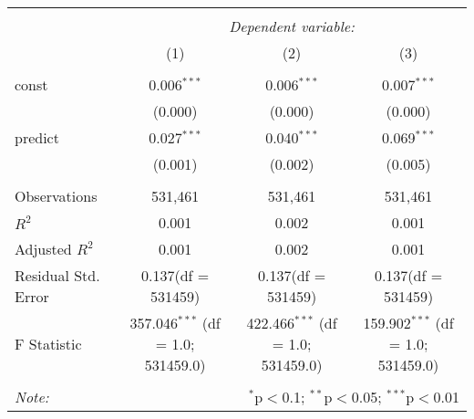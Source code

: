 \begin{table}[!htbp] \centering
\begin{tabular}{@{\extracolsep{5pt}}lccc}
\\[-1.8ex]\hline
\hline \\[-1.8ex]
& \multicolumn{3}{c}{\textit{Dependent variable:}} \
\cr \cline{3-4}
\\[-1.8ex] & (1) & (2) & (3) \\
\hline \\[-1.8ex]
 const & 0.006$^{***}$ & 0.006$^{***}$ & 0.007$^{***}$ \\
  & (0.000) & (0.000) & (0.000) \\
 predict & 0.027$^{***}$ & 0.040$^{***}$ & 0.069$^{***}$ \\
  & (0.001) & (0.002) & (0.005) \\
\hline \\[-1.8ex]
 Observations & 531,461 & 531,461 & 531,461 \\
 $R^2$ & 0.001 & 0.002 & 0.001 \\
 Adjusted $R^2$ & 0.001 & 0.002 & 0.001 \\
 Residual Std. Error & 0.137(df = 531459) & 0.137(df = 531459) & 0.137(df = 531459)  \\
 F Statistic & 357.046$^{***}$ (df = 1.0; 531459.0) & 422.466$^{***}$ (df = 1.0; 531459.0) & 159.902$^{***}$ (df = 1.0; 531459.0) \\
\hline
\hline \\[-1.8ex]
\textit{Note:} & \multicolumn{3}{r}{$^{*}$p$<$0.1; $^{**}$p$<$0.05; $^{***}$p$<$0.01} \\
\end{tabular}
\end{table}
